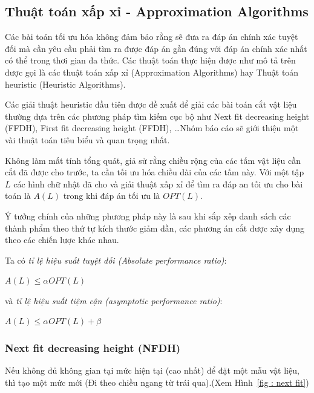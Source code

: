 \documentclass[a4paper]{article}
\begin{document}
\subsection{Thuật toán xấp xỉ - Approximation Algorithms}
\hspace{11pt}
Các bài toán tối ưu hóa không đảm bảo rằng sẽ đưa ra đáp án chính xác tuyệt đối mà cần yêu cầu phải tìm ra được đáp án gần đúng với đáp án chính xác nhất có thể trong thơi gian đa thức. Các thuật toán thực hiện được như mô tả trên được gọi là các thuật toán xấp xỉ (Approximation Algorithms) hay Thuật toán heuristic (Heuristic Algorithms).

\hspace{11pt}
Các giải thuật heuristic đầu tiên được đề xuất để giải các bài toán cắt vật liệu thường dựa trên các phương pháp tìm kiếm cục bộ như Next fit decreasing height (FFDH), First fit decreasing height (FFDH), \dots Nhóm báo cáo sẽ giới thiệu một vài thuật toán tiêu biểu và quan trọng nhất.

\hspace{11pt}
Không làm mất tính tổng quát, giả sử rằng chiều rộng của các tấm vật liệu cần cắt đã được cho trước, ta cần tối ưu hóa chiều dài của các tấm này. Với một tập \(L\) các hình chữ nhật đã cho và giải thuật xấp xỉ để tìm ra đáp an tối ưu cho bài toán là \(A(L)\) trong khi đáp án tối ưu là \(OPT(L)\). 

\hspace{11pt}
Ý tưởng chính của những phương pháp này là sau khi sắp xếp danh sách các thành phẩm theo thứ tự kích thước giảm dần, các phương án cắt được xây dụng theo các chiến lược khác nhau. 

Ta có \emph{tỉ lệ hiệu suất tuyệt đối (Absolute performance ratio)}:
\begin{center}
   \(A(L) \leq \alpha OPT(L)\) 
\end{center}


và \emph{tỉ lệ hiệu suất tiệm cận (asymptotic performance ratio)}:

\begin{center}
    \(A(L) \leq \alpha OPT(L) + \beta\)
\end{center}



\subsubsection{Next fit decreasing height (NFDH)}
\hspace{11pt}
Nếu không đủ không gian tại mức hiện tại (cao nhất) để đặt một mẫu vật liệu, thì tạo một mức mới (Đi theo chiều ngang từ trái qua).(Xem Hình~\ref{fig : next fit})
\end{document}
